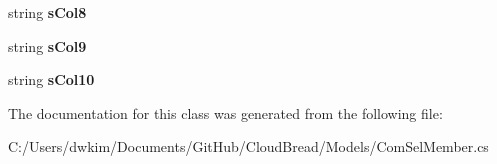 \begin{DoxyCompactItemize}
\item 
string {\bfseries s\+Col8}\hypertarget{a00067_a482cafbe7b895b2fee52e19fcda3a40f}{}\label{a00067_a482cafbe7b895b2fee52e19fcda3a40f}

\item 
string {\bfseries s\+Col9}\hypertarget{a00067_a9b96285bf0c5b4ac513f11dedde99ef1}{}\label{a00067_a9b96285bf0c5b4ac513f11dedde99ef1}

\item 
string {\bfseries s\+Col10}\hypertarget{a00067_a6e947f3de4e6894fafebd957d92a3ef8}{}\label{a00067_a6e947f3de4e6894fafebd957d92a3ef8}

\end{DoxyCompactItemize}


The documentation for this class was generated from the following file\+:\begin{DoxyCompactItemize}
\item 
C\+:/\+Users/dwkim/\+Documents/\+Git\+Hub/\+Cloud\+Bread/\+Models/Com\+Sel\+Member.\+cs\end{DoxyCompactItemize}
